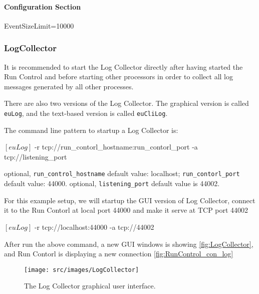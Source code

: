 \paragraph{Configuration Section}
\begin{listing}[conf]
[RunControl]
EventSizeLimit=10000
\end{listing}

\subsubsection{LogCollector}
\label{sec:logcollector}
It is recommended to start the Log Collector directly after having started the Run Control and before starting other processors in order to collect all log messages generated by all other processes.

There are also two versions of the Log Collector.
The graphical version is called \texttt{euLog},
and the text-based version is called \texttt{euCliLog}.

The command line pattern to startup a Log Collector is:
\begin{listing}[mybash]
$[euLog]$ -r tcp://{run_contorl_hostname}:{run_contorl_port} -a tcp://{listening_port}
\end{listing}

\begin{description}
optional, \texttt{run\_control\_hostname} default value: localhost;  \texttt{run\_contorl\_port}  default value: 44000.
optional, \texttt{listening\_port} default value is 44002.
\end{description}

For this example setup, we will startup the GUI version of Log Collector, connect it to the Run Contorl at local port 44000 and make it serve at TCP port 44002\\
\begin{listing}[mybash]
$[euLog]$ -r tcp://localhost:44000 -a tcp://44002
\end{listing}

After run the above command, a new GUI windows is showing \autoref{fig:LogCollector}, and Run Contorl is displaying a new connection \autoref{fig:RunControl_con_log}
\begin{figure}[htb]
  \begin{center}
    \texttt{[image: src/images/LogCollector]}
    \caption{The Log Collector graphical user interface.}
    \label{fig:LogCollector}
  \end{center}
\end{figure}


